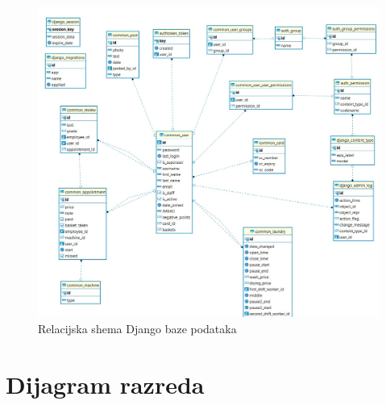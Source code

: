 			
			\begin{figure}[H]
				\includegraphics[scale=0.3]{slike/djangoBaza.jpeg} %
				\centering
				\caption{Relacijska shema Django baze podataka}
				\label{fig:promjene}
			\end{figure}
			\eject
			
			
		\section{Dijagram razreda}

			

